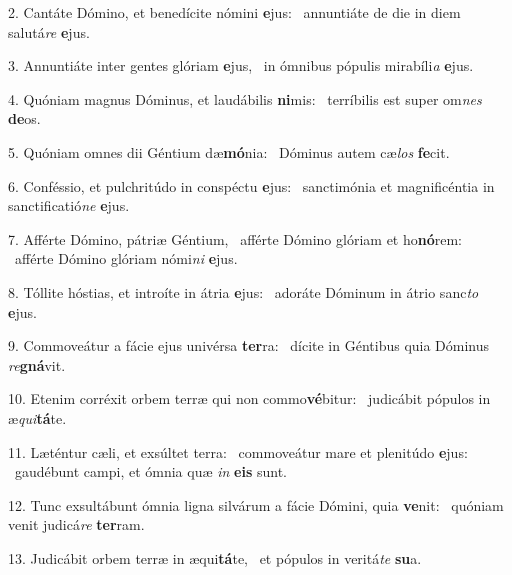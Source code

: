 2. Cantáte Dómino, et benedícite nómini \textbf{e}jus: \ast\  annuntiáte de die in diem salutá\textit{re} \textbf{e}jus.\

3. Annuntiáte inter gentes glóriam \textbf{e}jus, \ast\  in ómnibus pópulis mirabíli\textit{a} \textbf{e}jus.\

4. Quóniam magnus Dóminus, et laudábilis \textbf{ni}mis: \ast\  terríbilis est super om\textit{nes} \textbf{de}os.\

5. Quóniam omnes dii Géntium dæ\textbf{mó}nia: \ast\  Dóminus autem cæ\textit{los} \textbf{fe}cit.\

6. Conféssio, et pulchritúdo in conspéctu \textbf{e}jus: \ast\  sanctimónia et magnificéntia in sanctificatió\textit{ne} \textbf{e}jus.\

7. Afférte Dómino, pátriæ Géntium, \dag\  afférte Dómino glóriam et ho\textbf{nó}rem: \ast\  afférte Dómino glóriam nómi\textit{ni} \textbf{e}jus.\

8. Tóllite hóstias, et introíte in átria \textbf{e}jus: \ast\  adoráte Dóminum in átrio sanc\textit{to} \textbf{e}jus.\

9. Commoveátur a fácie ejus univérsa \textbf{ter}ra: \ast\  dícite in Géntibus quia Dóminus \textit{re}\textbf{gná}vit.\

10. Etenim corréxit orbem terræ qui non commo\textbf{vé}bitur: \ast\  judicábit pópulos in æ\textit{qui}\textbf{tá}te.\

11. Læténtur cæli, et exsúltet terra: \dag\  commoveátur mare et plenitúdo \textbf{e}jus: \ast\  gaudébunt campi, et ómnia quæ \textit{in} \textbf{e}\textbf{is} sunt.\

12. Tunc exsultábunt ómnia ligna silvárum a fácie Dómini, quia \textbf{ve}nit: \ast\  quóniam venit judicá\textit{re} \textbf{ter}ram.\

13. Judicábit orbem terræ in æqui\textbf{tá}te, \ast\  et pópulos in veritá\textit{te} \textbf{su}a.\

